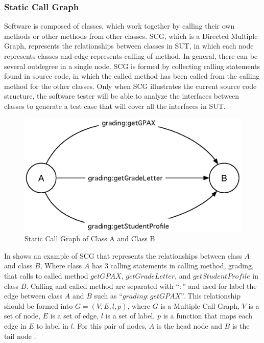 \subsubsection{Static Call Graph}
Software is composed of classes, which work together by calling 
their own methods or other methods from other classes. 
SCG, which is a Directed Multiple Graph, represents the relationships 
between classes in SUT, in which each node represents classes 
and edge represents calling of method. In general, there can be 
several outdegree in a single node. SCG is formed by collecting 
calling statements found in source code, in which the called method 
has been called from the calling method for the other classes. 
Only when SCG illustrates the current source code structure, 
the software tester will be able to analyze the interfaces 
between classes to generate a test case that will cover 
all the interfaces in SUT.

\begin{figure}[ht!]
    \centering
    \includegraphics[width=0.9\linewidth]{figures/SCG-A-and-B}
    \caption{Static Call Graph of Class A and Class B}
    \label{fig:scgAandB}
\end{figure}

In  shows an example of SCG that represents 
the relationships between class $A$ and class $B$, Where class $A$ has 
3 calling statements in calling method, grading, that calls 
to called method $getGPAX$, $getGradeLetter$, and $getStudentProfile$ 
in class $B$. Calling and called method are separated with “$:$” 
and used for label the edge between class $A$ and $B$ 
such as “$grading:getGPAX$”. This relationship should be formed into 
$G = (V, E, l, p)$, where $G$ is a Multiple Call Graph, 
$V$ is a set of node, $E$ is a set of edge, $l$ is a set of label, 
$p$ is a function that maps each edge in $E$ to label in $l$. 
For this pair of nodes, $A$ is the head node and $B$ is the tail node 
\cite{Bang-Jensen:2008:DTA:1523254}.

